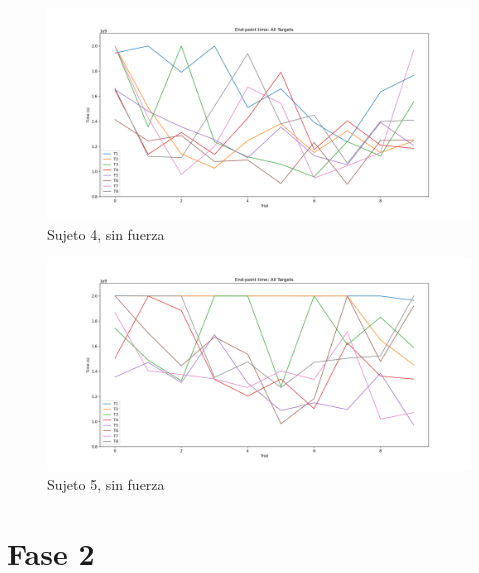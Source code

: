 \documentclass[a4paper,11pt, oneside]{book}
\begin{document}
\begin{figure}[H]
	\includegraphics[width=\linewidth]{sujeto4/no_force/evolution_time}
	\caption{Sujeto 4, sin fuerza}
	\label{4-1-3}
\end{figure}
\begin{figure}[H]
	\includegraphics[width=\linewidth]{sujeto5/no_force/evolution_time}
	\caption{Sujeto 5, sin fuerza}
	\label{5-1-3}
\end{figure}

\section{Fase 2}
\end{document}
